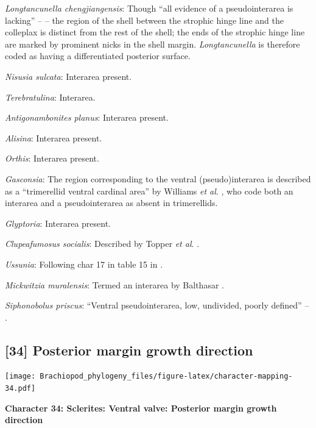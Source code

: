 \documentclass[]{book}
\theoremstyle{definition}
\theoremstyle{definition}
\theoremstyle{definition}
\theoremstyle{remark}
\begin{document}
\emph{Longtancunella chengjiangensis}: Though ``all evidence of a
pseudointerarea is lacking'' -- \citet{Zhang2011Theexceptionally} -- the
region of the shell between the strophic hinge line and the colleplax
\citep[fig. 2 in][]{Zhang2011Theexceptionally} is distinct from the rest
of the shell; the ends of the strophic hinge line are marked by
prominent nicks in the shell margin. \emph{Longtancunella} is therefore
coded as having a differentiated posterior surface.

\emph{Nisusia sulcata}: Interarea present.

\emph{Terebratulina}: Interarea.

\emph{Antigonambonites planus}: Interarea present.

\emph{Alisina}: Interarea present.

\emph{Orthis}: Interarea present.

\emph{Gasconsia}: The region corresponding to the ventral
(pseudo)interarea is described as a ``trimerellid ventral cardinal
area'' by Williams \emph{et al}.
\citeyearpar[p.162]{Williams2000BrachiopodaLinguliformea}, who code both
an interarea and a pseudointerarea as absent in trimerellids.

\emph{Glyptoria}: Interarea present.

\emph{Clupeafumosus socialis}: Described by Topper \emph{et al}.
\citeyearpar{Topper2013Reappraisalof}.

\emph{Ussunia}: Following char 17 in table 15 in
\citet{Williams2000BrachiopodaLinguliformea}.

\emph{Mickwitzia muralensis}: Termed an interarea by Balthasar
\citeyearpar{Balthasar2004Shellstructure}.

\emph{Siphonobolus priscus}: ``Ventral pseudointerarea, low, undivided,
poorly defined'' -- \citet{Williams2000BrachiopodaLinguliformea}.

\hypertarget{posterior-margin-growth-direction}{%
\subsection*{{[}34{]} Posterior margin growth
direction}\label{posterior-margin-growth-direction}}

\texttt{[image: Brachiopod\_phylogeny\_files/figure-latex/character-mapping-34.pdf]}

\textbf{Character 34: Sclerites: Ventral valve: Posterior margin growth
direction}
\end{document}
